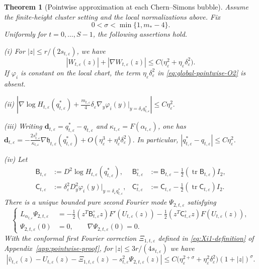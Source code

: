 \documentclass[11pt,reqno]{amsart}
\numberwithin{equation}{section}
\newtheorem{theorem}{Theorem}[section]
\theoremstyle{definition}
\theoremstyle{remark}
\newcommand{\eps}{\varepsilon}
\newcommand{\etae}{\eta_{\eps}}
\newcommand{\de}{\delta_{\eps}}
\newcommand{\tr}{\operatorname{tr}}
\begin{document}
\begin{theorem}[Pointwise approximation at each Chern--Simons bubble]
\label{prop:refined-profile}
Assume the finite-height cluster setting and the local normalizations above.
Fix
\begin{equation}
  0<\sigma<\min\{1,m_*-4\}.
  \label{eq:sigma-choice}
\end{equation}
Uniformly for $t=0,\dots,S-1$, the following assertions hold.

\smallskip
\noindent\textup{(i)}   
For $|z|\le r/(2s_{t,\eps})$, we have
\begin{equation}\label{eq:global-pointwise-O2}
 |W_{t,\eps}(z)|+|\nabla W_{t,\eps}(z)|
 \le C\bigl(\etae^2+\etae\de^2\bigr).
\end{equation}
If $\varphi_i$ is constant on the local chart, the term
$\etae\de^2$ in \eqref{eq:global-pointwise-O2} is absent.

\smallskip
\noindent\textup{(ii)} \(
  \left|
  \nabla\log H_{t,\eps}(q_{t,\eps}^*)
  +\frac{m_{t,\eps}}4
   \de\nabla_y\varphi_i(y)\Big|_{y=\de q_{t,\eps}^*}
  \right|
  \le C\etae^2.
\)

\smallskip
\noindent\textup{(iii)}
Writing
$\mathbf{d}_{t,\eps}=q_{t,\eps}^*-q_{t,\eps}$ and
$\kappa_{t,\eps}=F(\alpha_{t,\eps})$, one has
\(
  \mathbf{d}_{t,\eps}
  =-\frac{2s_{t,\eps}^2}{\kappa_{t,\eps}}
  \nabla\mathfrak h_{t,\eps}(q_{t,\eps}^*)
  +O(\etae^3+\etae^4\de^2).
  \)
In particular, $|q_{t,\eps}^*-q_{t,\eps}|\le C\etae^2$.

\smallskip
\noindent\textup{(iv)}
Let
\begin{equation}\label{eq:B-tracefree}
\begin{aligned}
 \mathsf B_{t,\eps}
   &:=D^2\log H_{t,\eps}(q_{t,\eps}^*),
 &\mathsf B_{t,\eps}^{\circ}
   &:=\mathsf B_{t,\eps}-\tfrac12(\tr\mathsf B_{t,\eps})I_2,\\
 \mathsf C_{t,\eps}
   &:=\de^2D^2_y\varphi_i(y)\Big|_{y=\de q^*_{t,\eps}},
 &\mathsf C_{t,\eps}^{\circ}
   &:=\mathsf C_{t,\eps}-\tfrac12(\tr\mathsf C_{t,\eps})I_2.
\end{aligned}
\end{equation}
There is a unique bounded pure second Fourier mode $\Psi_{2,t,\eps}$
satisfying
\begin{equation}\label{eq:Psi2-equation}
\left\{
\begin{aligned}
 L_{\alpha_{t,\eps}}\Psi_{2,t,\eps}
   &=-\tfrac12(z^T\mathsf B_{t,\eps}^{\circ}z)F'(U_{t,\eps}(z))
     -\tfrac12(z^T\mathsf C_{t,\eps}^{\circ}z)F(U_{t,\eps}(z)),\\
 \Psi_{2,t,\eps}(0)&=0,\qquad \nabla\Psi_{2,t,\eps}(0)=0.
\end{aligned}
\right.
\end{equation}
With the conformal first Fourier correction $\Xi_{1,t,\eps}$
defined in \eqref{eq:Xi1-definition} of
Appendix~\ref{app:pointwise-proof},
for $|z|\le 3r/(4s_{t,\eps})$ we have
\begin{equation}\label{eq:second-mode-refinement}
 \left|\widehat v_{t,\eps}(z)-U_{t,\eps}(z)
       -\Xi_{1,t,\eps}(z)-s_{t,\eps}^2\Psi_{2,t,\eps}(z)\right|
 \le C\bigl(\etae^{2+\sigma}+\etae^2\de^2\bigr)(1+|z|)^\sigma.
\end{equation}


\end{theorem}
\end{document}
